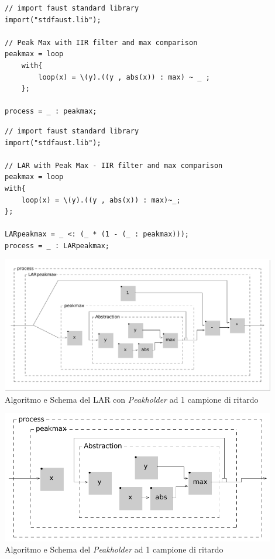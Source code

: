 \vspace{0.5cm}
\begin{lstlisting}
// import faust standard library
import("stdfaust.lib");

// Peak Max with IIR filter and max comparison
peakmax = loop
    with{
        loop(x) = \(y).((y , abs(x)) : max) ~ _ ;
    };
    
process = _ : peakmax;
\end{lstlisting}

\begin{lstlisting}
// import faust standard library
import("stdfaust.lib");
        
// LAR with Peak Max - IIR filter and max comparison
peakmax = loop
with{
    loop(x) = \(y).((y , abs(x)) : max)~_;
};
        
LARpeakmax = _ <: (_ * (1 - (_ : peakmax)));
process = _ : LARpeakmax;
\end{lstlisting}

\begin{center}
    \includegraphics[width=12cm]{figures/LARpeakmax.pdf} \\
    {Algoritmo e Schema del LAR con \textit{Peakholder} ad 1 campione di ritardo} \\ 
\end{center}
\vspace{0.5cm}

\begin{center}
    \includegraphics[width=12cm]{figures/PeakholderIIR.pdf} \\
    {Algoritmo e Schema del \textit{Peakholder} ad 1 campione di ritardo} \\ 
    \end{center}

